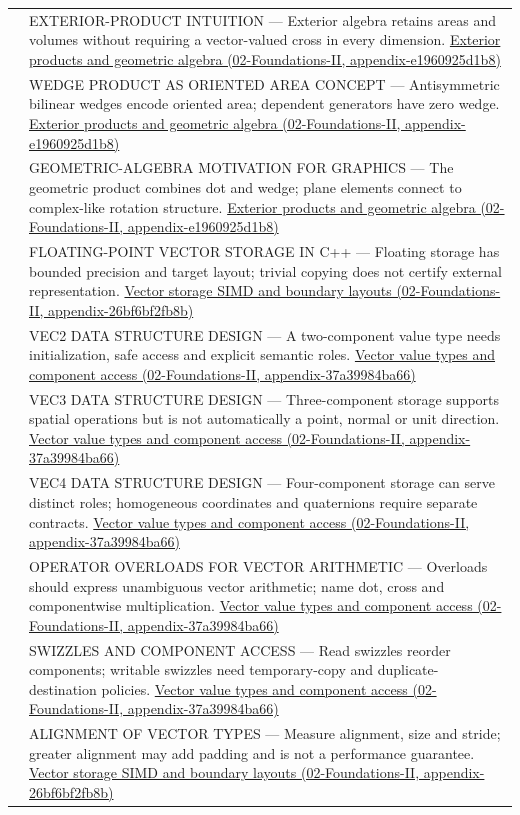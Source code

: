 {\begin{longtable}[]{@{}
  >{\raggedright\arraybackslash}p{}
  >{\raggedright\arraybackslash}p{}@{}}
584 & EXTERIOR-PRODUCT INTUITION --- Exterior algebra retains areas and volumes without requiring a vector-valued cross in every dimension. \href{}{Exterior products and geometric algebra (02-Foundations-II, appendix-e1960925d1b8)} \\
585 & WEDGE PRODUCT AS ORIENTED AREA CONCEPT --- Antisymmetric bilinear wedges encode oriented area; dependent generators have zero wedge. \href{}{Exterior products and geometric algebra (02-Foundations-II, appendix-e1960925d1b8)} \\
586 & GEOMETRIC-ALGEBRA MOTIVATION FOR GRAPHICS --- The geometric product combines dot and wedge; plane elements connect to complex-like rotation structure. \href{}{Exterior products and geometric algebra (02-Foundations-II, appendix-e1960925d1b8)} \\
587 & FLOATING-POINT VECTOR STORAGE IN C++ --- Floating storage has bounded precision and target layout; trivial copying does not certify external representation. \href{}{Vector storage SIMD and boundary layouts (02-Foundations-II, appendix-26bf6bf2fb8b)} \\
588 & VEC2 DATA STRUCTURE DESIGN --- A two-component value type needs initialization, safe access and explicit semantic roles. \href{}{Vector value types and component access (02-Foundations-II, appendix-37a39984ba66)} \\
589 & VEC3 DATA STRUCTURE DESIGN --- Three-component storage supports spatial operations but is not automatically a point, normal or unit direction. \href{}{Vector value types and component access (02-Foundations-II, appendix-37a39984ba66)} \\
590 & VEC4 DATA STRUCTURE DESIGN --- Four-component storage can serve distinct roles; homogeneous coordinates and quaternions require separate contracts. \href{}{Vector value types and component access (02-Foundations-II, appendix-37a39984ba66)} \\
591 & OPERATOR OVERLOADS FOR VECTOR ARITHMETIC --- Overloads should express unambiguous vector arithmetic; name dot, cross and componentwise multiplication. \href{}{Vector value types and component access (02-Foundations-II, appendix-37a39984ba66)} \\
592 & SWIZZLES AND COMPONENT ACCESS --- Read swizzles reorder components; writable swizzles need temporary-copy and duplicate-destination policies. \href{}{Vector value types and component access (02-Foundations-II, appendix-37a39984ba66)} \\
593 & ALIGNMENT OF VECTOR TYPES --- Measure alignment, size and stride; greater alignment may add padding and is not a performance guarantee. \href{}{Vector storage SIMD and boundary layouts (02-Foundations-II, appendix-26bf6bf2fb8b)} \\

\end{longtable}}
